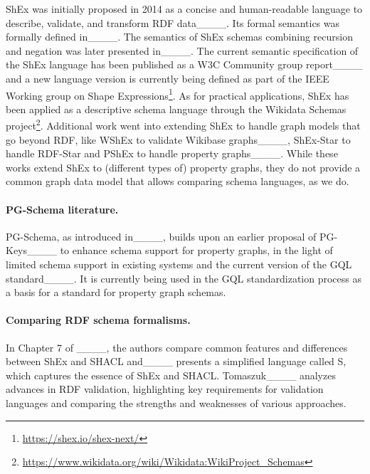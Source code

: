 ShEx was initially proposed in 2014 as a concise and human-readable language to describe, validate, and transform RDF data____.
Its formal semantics was formally defined in____.
The semantics of ShEx schemas combining recursion and negation was later presented in____.
The current semantic specification of the ShEx language has been published as a W3C Community group report____ and a new language version is currently being defined as part of the IEEE Working group on Shape Expressions\footnote{\url{https://shex.io/shex-next/}}. As for practical applications, ShEx has been applied as a descriptive schema language through the
Wikidata Schemas project\footnote{\url{https://www.wikidata.org/wiki/Wikidata:WikiProject_Schemas}}.
Additional work went into extending ShEx to handle graph models that go beyond
RDF, like WShEx to validate Wikibase graphs____, ShEx-Star to handle
RDF-Star and PShEx to handle property graphs____. While these works
extend ShEx to (different types of) property graphs, they do not provide a
common graph data model  that
allows comparing schema languages, as we do.


\paragraph{PG-Schema literature.}

PG-Schema, as introduced in____, builds upon an earlier proposal of PG-Keys____ to enhance schema support for property graphs, in the light of limited schema support in existing systems and the current version of the GQL standard____. It is currently being used in the GQL standardization process as a basis for a standard for property graph schemas.


\paragraph{Comparing RDF schema formalisms.}

In Chapter 7 of ____, the authors compare common features and differences between ShEx and SHACL and____ presents a simplified language called S, which captures the essence of ShEx and SHACL. Tomaszuk____ analyzes advances in RDF validation, highlighting key requirements for validation languages and comparing the strengths and weaknesses of various approaches.

